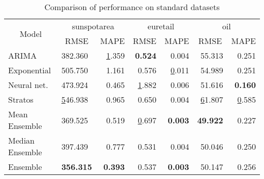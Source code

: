 \begin{table}[]
\centering
\caption{Comparison of performance on standard datasets}
\begin{tabular}{|l|l|r|r|r|r|r|}
\hline
\multicolumn{1}{|c|}{\multirow{2}{*}{Model}} & \multicolumn{2}{c|}{sunspotarea}                                  & \multicolumn{2}{c|}{euretail}                                        & \multicolumn{2}{c|}{oil}                                              \\ \cline{2-7} 
\multicolumn{1}{|c|}{}                       & \multicolumn{1}{c|}{RMSE} & \multicolumn{1}{c|}{MAPE}             & \multicolumn{1}{c|}{RMSE}    & \multicolumn{1}{c|}{MAPE}             & \multicolumn{1}{c|}{RMSE}              & \multicolumn{1}{c|}{MAPE}    \\ \hline
ARIMA                                        & 382.360                 & {\ul 1.359}                         & \textbf{0.524}             & 0.004                               & 55.313                               & 0.251                      \\ \hline
Exponential                                  & 505.750                 & 1.161                               & 0.576                      & {\ul 0.011}                         & 54.989                               & 0.251                      \\ \hline
Neural net.                                  & 473.924                 & 0.465                               & {\ul 1.882}                & 0.006                               & 51.616                               & \textbf{0.160}             \\ \hline
Stratos                                      & {\ul 546.938}           & 0.965                               & 0.650                      & 0.004                               & {\ul 61.807}                         & {\ul 0.585}                \\ \hline
Mean Ensemble                                  & 369.525                 & 0.519                               & {\ul 0.697}                & \textbf{0.003}                               & \textbf{49.922}                              & 0.227             \\ \hline
Median Ensemble                                  & 397.439                 & 0.777                               & 0.531                & 0.004                               & 50.046                              &  0.250             \\ \hline

Ensemble                                     & \textbf{356.315}        & \textbf{0.393} & 0.537 & \textbf{0.003} &  50.147 & 0.256 \\ \hline
\end{tabular}
\end{table}

